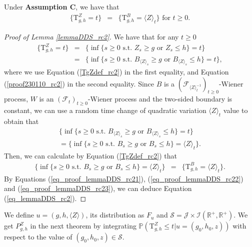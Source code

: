 \documentclass[aop]{imsart}
\theoremstyle{plain}
\theoremstyle{remark}
\newcommand{\reels}{\mathbb{R}}
\newcommand{\proba}{\mathbb{P}}
\newcommand{\Tau}{\mathrm{T}}
\begin{document}
\begin{lemma}
\label{lemmaDDS_rc2}
Under \textbf{Assumption C}, we have that
\begin{eqnarray}
\label{eq_lemmaDDS_rc2}
\big\{ \Tau_{g,h}^Z =t \big\} & = & \big\{ \Tau_{g,h}^B = \langle Z\rangle_{t} \big\} \text{ for } t \geq 0.
\end{eqnarray}
\end{lemma}
\begin{proof}[Proof of Lemma \ref{lemmaDDS_rc2}]
We have that for any $t \geq 0$
\begin{eqnarray}
\nonumber \big\{ \Tau_{g,h}^Z =t \big\} 
& = & \big\{ \inf \{s \geq 0 \text{ s.t. } Z_s \geq g \text{ or } Z_s \leq h\} = t \big\}\\ \label{eq_proof_lemmaDDS_rc21} 
& = & \big\{ \inf \{s \geq 0\text{ s.t. } B_{\langle Z\rangle_{s}} \geq g \text{ or } B_{\langle Z\rangle_{s}} \leq h\} = t \big\},
\end{eqnarray}
where we use Equation (\ref{TgZdef_rc2}) in the first equality, and Equation (\ref{proof230110_rc2}) in the second equality. Since $B$ is a $({\mathcal {F}}_{\langle Z\rangle_{t}^{-1}})_{t\geq 0}$-Wiener process, $W$ is an $({\mathcal {F}}_{t})_{t\geq 0}$-Wiener process and the two-sided boundary is constant, we can use a random time change of quadratic variation $\langle Z\rangle_t$ value to obtain that
\begin{eqnarray}
\label{eq_proof_lemmaDDS_rc22} \big\{ \inf \{s \geq 0\text{ s.t. } B_{\langle Z\rangle_{s}} \geq g \text{ or } B_{\langle Z\rangle_{s}} \leq h\} = t \big\} \\ \nonumber = \big\{\inf \{s \geq 0 \text{ s.t. } B_s \geq g \text{ or } B_{s} \leq h \} = \langle Z\rangle_t \big\}.
\end{eqnarray}
Then, we can calculate by Equation (\ref{TgZdef_rc2}) that
\begin{eqnarray}
\label{eq_proof_lemmaDDS_rc23} \big\{\inf \{s \geq 0 \text{ s.t. } B_s \geq g \text{ or } B_{s} \leq h \} = \langle Z\rangle_t \big\} & = & \big\{ \Tau^B_{g,h} = \langle Z\rangle_t \big\}. 
\end{eqnarray}
By Equations (\ref{eq_proof_lemmaDDS_rc21}), (\ref{eq_proof_lemmaDDS_rc22}) and (\ref{eq_proof_lemmaDDS_rc23}), we can deduce Equation (\ref{eq_lemmaDDS_rc2}).
\end{proof}
\noindent We define $u=(g,h,\langle Z\rangle)$, its distribution as $F_{u}$ and $\mathcal{S} = \mathcal{J} \times \mathcal{I}(\reels^+,\reels^+)$. We get $P_{g,h}^Z$ in the next theorem by integrating $\proba (\Tau^{Z}_{g,h} \leq t | u=(g_0,h_0,z))$ with respect to the value of $(g_0,h_0,z) \in \mathcal{S}$.
\end{document}
